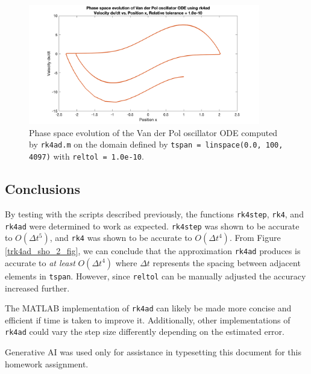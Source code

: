 \documentclass[10pt]{article}
\def\code#1{\texttt{#1}} %
\begin{document}
\begin{figure}[H]
\centering
\includegraphics[width=0.9\textwidth]{trk4ad_vdp_2.png}
\caption{Phase space evolution of the Van der Pol oscillator ODE computed by \code{rk4ad.m} on the domain
defined by \code{tspan = linspace(0.0, 100, 4097)} with \code{reltol = 1.0e-10}.}
\label{trk4ad_vdp_2_fig}
\end{figure}

\subsection*{Conclusions}

By testing with the scripts described previously, the functions \code{rk4step}, \code{rk4}, and 
\code{rk4ad} were determined to work as expected. \code{rk4step} was shown to be accurate
to $O(\Delta t^5)$, and \code{rk4} was shown to be accurate to $O(\Delta t^4)$. From Figure 
\ref{trk4ad_sho_2_fig}, we can conclude that the approximation \code{rk4ad} produces is accurate to 
\textit{at least} $O(\Delta t^4)$ where $\Delta t$ represents the spacing between adjacent elements in 
\code{tspan}. However, since \code{reltol} can be manually adjusted the accuracy increased further. 

The MATLAB implementation of \code{rk4ad} can likely be made more concise and efficient if time is taken 
to improve it. Additionally, other implementations of \code{rk4ad} could vary the step size differently 
depending on the estimated error. 

Generative AI was used only for assistance in typesetting this document for this homework assignment. 

\pagebreak
\end{document}
